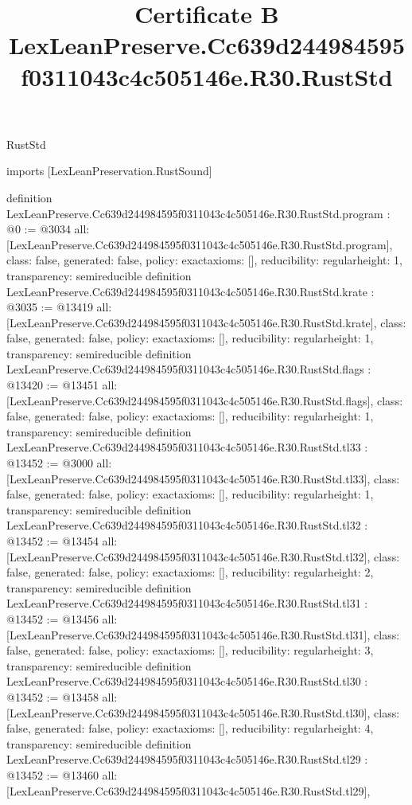 \begin{lexlean}{RustStd}
\title{Certificate B LexLeanPreserve.Cc639d244984595f0311043c4c505146e.R30.RustStd}
\begin{coremodule}
imports [LexLeanPreservation.RustSound]

definition LexLeanPreserve.Cc639d244984595f0311043c4c505146e.R30.RustStd.program : @0 := @3034 {
  all: [LexLeanPreserve.Cc639d244984595f0311043c4c505146e.R30.RustStd.program],
  class: false,
  generated: false,
  policy: exact{axioms: []},
  reducibility: regular{height: 1},
  transparency: semireducible
}
definition LexLeanPreserve.Cc639d244984595f0311043c4c505146e.R30.RustStd.krate : @3035 := @13419 {
  all: [LexLeanPreserve.Cc639d244984595f0311043c4c505146e.R30.RustStd.krate],
  class: false,
  generated: false,
  policy: exact{axioms: []},
  reducibility: regular{height: 1},
  transparency: semireducible
}
definition LexLeanPreserve.Cc639d244984595f0311043c4c505146e.R30.RustStd.flags : @13420 := @13451 {
  all: [LexLeanPreserve.Cc639d244984595f0311043c4c505146e.R30.RustStd.flags],
  class: false,
  generated: false,
  policy: exact{axioms: []},
  reducibility: regular{height: 1},
  transparency: semireducible
}
definition LexLeanPreserve.Cc639d244984595f0311043c4c505146e.R30.RustStd.tl33 : @13452 := @3000 {
  all: [LexLeanPreserve.Cc639d244984595f0311043c4c505146e.R30.RustStd.tl33],
  class: false,
  generated: false,
  policy: exact{axioms: []},
  reducibility: regular{height: 1},
  transparency: semireducible
}
definition LexLeanPreserve.Cc639d244984595f0311043c4c505146e.R30.RustStd.tl32 : @13452 := @13454 {
  all: [LexLeanPreserve.Cc639d244984595f0311043c4c505146e.R30.RustStd.tl32],
  class: false,
  generated: false,
  policy: exact{axioms: []},
  reducibility: regular{height: 2},
  transparency: semireducible
}
definition LexLeanPreserve.Cc639d244984595f0311043c4c505146e.R30.RustStd.tl31 : @13452 := @13456 {
  all: [LexLeanPreserve.Cc639d244984595f0311043c4c505146e.R30.RustStd.tl31],
  class: false,
  generated: false,
  policy: exact{axioms: []},
  reducibility: regular{height: 3},
  transparency: semireducible
}
definition LexLeanPreserve.Cc639d244984595f0311043c4c505146e.R30.RustStd.tl30 : @13452 := @13458 {
  all: [LexLeanPreserve.Cc639d244984595f0311043c4c505146e.R30.RustStd.tl30],
  class: false,
  generated: false,
  policy: exact{axioms: []},
  reducibility: regular{height: 4},
  transparency: semireducible
}
definition LexLeanPreserve.Cc639d244984595f0311043c4c505146e.R30.RustStd.tl29 : @13452 := @13460 {
  all: [LexLeanPreserve.Cc639d244984595f0311043c4c505146e.R30.RustStd.tl29],
}
\end{coremodule}
\end{lexlean}

